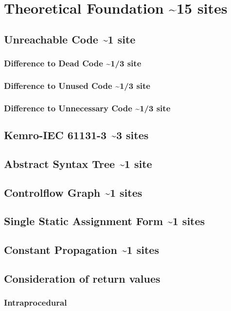 
\chapter {Theoretical Foundation \textasciitilde 15 sites}
\label {cha:theoretical foundation}

\section{Unreachable Code  \textasciitilde 1 site}
\subsection{Difference to Dead Code \textasciitilde 1/3 site}
\subsection{Difference to Unused Code \textasciitilde 1/3 site}
\subsection{Difference to Unnecessary Code \textasciitilde 1/3 site}
\section{Kemro-IEC 61131-3 \textasciitilde 3 sites}
\section{Abstract Syntax Tree \textasciitilde 1 site}
\section{Controlflow Graph \textasciitilde 1 sites}
\section{Single Static Assignment Form \textasciitilde 1 sites}
\section{Constant Propagation \textasciitilde 1 sites}
\section{Consideration of return values}
\subsection{Intraprocedural}
